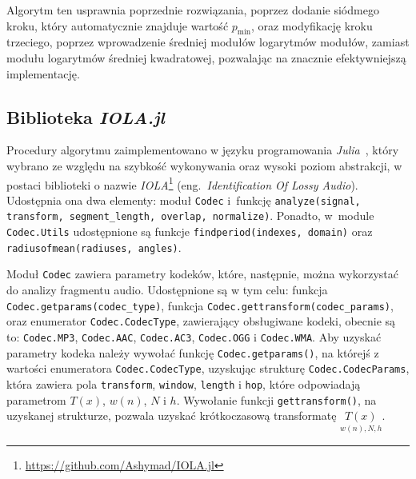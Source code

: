 \documentclass[pl,12pt]{aghdpl}
\let\Oldsubsection\subsection%
\renewcommand{\subsection}{\FloatBarrier\Oldsubsection}
\begin{document}
Algorytm ten usprawnia poprzednie rozwiązania, poprzez dodanie siódmego kroku,
który automatycznie znajduje wartość $p_{\min}$, oraz modyfikację kroku
trzeciego, poprzez wprowadzenie średniej modułów logarytmów modułów, zamiast
modułu logarytmów średniej kwadratowej, pozwalając na znacznie efektywniejszą
implementację.
\subsection{Biblioteka \textit{IOLA.jl}}
Procedury algorytmu zaimplementowano w języku programowania
\textit{Julia}~\cite{BezansonEdelmanKarpinskiShah2017}, który wybrano ze
względu na szybkość wykonywania oraz wysoki poziom abstrakcji, w postaci
biblioteki o nazwie
\textit{IOLA}\footnote{\url{https://github.com/Ashymad/IOLA.jl}} (eng.\
\textit{Identification Of Lossy Audio}). Udostępnia ona dwa elementy: moduł
\lstinline|Codec| i~funkcję
\lstinline|analyze(signal, transform, segment_length, overlap, normalize)|.
Ponadto, w~module \lstinline|Codec.Utils|
udostępnione są funkcje \lstinline|findperiod(indexes, domain)| oraz
\lstinline|radiusofmean(radiuses, angles)|.

Moduł \lstinline|Codec| zawiera parametry kodeków, które, następnie, można
wykorzystać do analizy fragmentu audio. Udostępnione są w tym celu: funkcja
\lstinline|Codec.getparams(codec_type)|, funkcja
\lstinline|Codec.gettransform(codec_params)|, oraz enumerator
\lstinline|Codec.CodecType|, zawierający obsługiwane kodeki, obecnie są to:
\lstinline|Codec.MP3|, \lstinline|Codec.AAC|, \lstinline|Codec.AC3|,
\lstinline|Codec.OGG| i \lstinline|Codec.WMA|. Aby uzyskać parametry kodeka
należy wywołać funkcję \lstinline|Codec.getparams()|, na którejś z wartości
enumeratora \lstinline|Codec.CodecType|, uzyskując strukturę
\lstinline|Codec.CodecParams|, która zawiera pola \lstinline|transform|,
\lstinline|window|, \lstinline|length| i \lstinline|hop|, które odpowiadają
parametrom $T(x)$, $w(n)$, $N$ i $h$. Wywołanie funkcji
\lstinline|gettransform()|, na uzyskanej strukturze, pozwala uzyskać
krótkoczasową transformatę $\underset{w(n),N,h}{T(x)}$.
\end{document}
